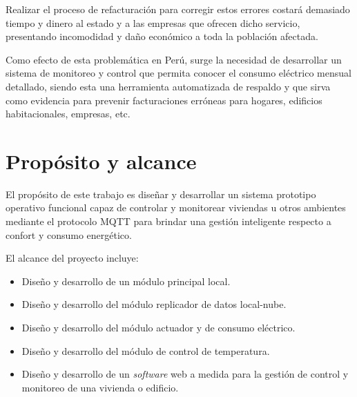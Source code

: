 Realizar el proceso de refacturación para corregir estos errores costará demasiado tiempo y dinero al estado y a las empresas que ofrecen dicho servicio, presentando incomodidad y daño económico a toda la población afectada. 

Como efecto de esta problemática en Perú, surge la necesidad de desarrollar un sistema de monitoreo y control que permita conocer el consumo eléctrico mensual detallado, siendo esta una herramienta automatizada de respaldo y que sirva como evidencia para prevenir facturaciones erróneas para hogares, edificios habitacionales, empresas, etc.




\section{Propósito y alcance}




El propósito de este trabajo es diseñar y desarrollar un sistema prototipo operativo funcional capaz de controlar y monitorear viviendas u otros ambientes mediante el protocolo MQTT para brindar una gestión inteligente respecto a confort y consumo energético.


El alcance del proyecto incluye:
\begin{itemize}
\item Diseño y desarrollo de un módulo principal local.
\item Diseño y desarrollo del módulo replicador de datos local-nube.
\item Diseño y desarrollo del módulo actuador y de consumo eléctrico.
\item Diseño y desarrollo del módulo de control de temperatura.
\item Diseño y desarrollo de un \emph{software} web a medida para la gestión de control y monitoreo de una vivienda o edificio.
\end{itemize}

